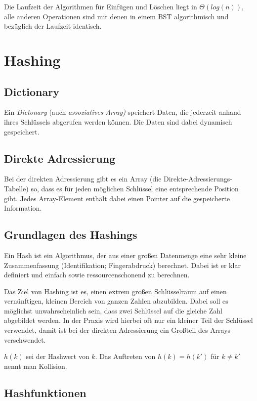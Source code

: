 \documentclass[12pt]{article}
\begin{document}
Die Laufzeit der Algorithmen für Einfügen und Löschen liegt in $\Theta(log(n))$, alle anderen Operationen sind mit denen in einem BST algorithmisch und bezüglich der Laufzeit identisch.

\section{Hashing}

\subsection{Dictionary}

Ein \textit{Dictonary} (auch \textit{assoziatives Array)} speichert Daten, die jederzeit anhand ihres Schlüssels abgerufen werden können. Die Daten sind dabei dynamisch gespeichert.

\subsection{Direkte Adressierung}

Bei der direkten Adressierung gibt es ein Array (die Direkte-Adressierungs-Tabelle) so, dass es für jeden möglichen Schlüssel eine entsprechende Position gibt. Jedes Array-Element enthält dabei einen Pointer auf die gespeicherte Information.

\subsection{Grundlagen des Hashings}

Ein Hash ist ein Algorithmus, der aus einer großen Datenmenge eine sehr kleine Zusammenfassung (Identifikation; Fingerabdruck) berechnet. Dabei ist er klar definiert und einfach sowie ressourcenschonend zu berechnen.

Das Ziel von Hashing ist es, einen extrem großen Schlüsselraum auf einen vernünftigen, kleinen Bereich von ganzen Zahlen abzubilden. Dabei soll es möglichst unwahrscheinlich sein, dass zwei Schlüssel auf die gleiche Zahl abgebildet werden. In der Praxis wird hierbei oft nur ein kleiner Teil der Schlüssel verwendet, damit ist bei der direkten Adressierung ein Großteil des Arrays verschwendet.

$h(k)$ sei der Hashwert von $k$. Das Auftreten von $h(k) = h(k')$ für $k \neq k'$ nennt man Kollision.

\subsection{Hashfunktionen}
\end{document}
